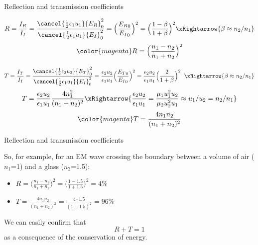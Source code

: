 \begin{frame}{Reflection and transmission coefficients}

\begin{equation*}
   R = \frac{I_R}{I_I} =
          \frac{ \cancel{ \frac{1}{2} \epsilon_1 u_1} {E_R}_0^2}{ \cancel{ \frac{1}{2} \epsilon_1 u_1} {E_I}_0^2} =
          \Big( \frac{ {E_R}_0 } { {E_I}_0} \Big)^2 =
          \Big( \frac{1-\beta}{1+\beta} \Big)^2
          \xRightarrow{\beta \approx n_2/n_1}
\end{equation*}
\begin{equation*}
{\color{magenta}
   R = \Big( \frac{n_1-n_2}{n_1+n_2} \Big)^2
}
\end{equation*}

\vspace{0.1cm}

\begin{equation*}
   T = \frac{I_T}{I_I} =
          \frac{ \cancel{ \frac{1}{2} \epsilon_2 u_2} {E_T}_0^2}{ \cancel{ \frac{1}{2} \epsilon_1 u_1} {E_I}_0^2} =
          \frac{\epsilon_2 u_2}{\epsilon_1 u_1} \Big( \frac{{E_T}_0}{{E_I}_0} \Big)^2 =
          \frac{\epsilon_2 u_2}{\epsilon_1 u_1}\Big( \frac{2}{1+\beta} \Big)^2 \;\;
          \xRightarrow{\beta \approx n_2/n_1}
\end{equation*}
\begin{equation*}
   T = \frac{\epsilon_2 u_2}{\epsilon_1 u_1} \frac{4 n_1^2}{(n_1+n_2)^2}
          \xRightarrow{\displaystyle \small \frac{\epsilon_2 u_2}{\epsilon_1 u_1} = \frac{\mu_1 u_1^2 u_2}{\mu_2 u_2^2 u_1} \approx u_1/u_2 = n_2/n_1}
\end{equation*}
\begin{equation*}
{\color{magenta}
    T = \frac{4 n_1 n_2}{(n_1+n_2)^2}
}
\end{equation*}

\end{frame}


\begin{frame}{Reflection and transmission coefficients}

So, for example, for an EM wave crossing the boundary between a volume of air ($n_1$=1)
and a glass ($n_2$=1.5):
\vspace{0.2cm}
\begin{itemize}
  \item $\displaystyle R = \Big( \frac{n_1-n_2}{n_1+n_2} \Big)^2 = \Big( \frac{1-1.5}{1+1.5} \Big)^2 = 4\%$
   \vspace{0.2cm}
  \item $\displaystyle T =  \frac{4 n_1 n_2}{(n_1+n_2)^2} =  \frac{4 \cdot 1.5}{(1+1.5)^2} = 96\%$
\end{itemize}

\vspace{0.4cm}

We can easily confirm that
\begin{equation*}
  R + T = 1
\end{equation*}
as a consequence of the conservation of energy.

\end{frame}

